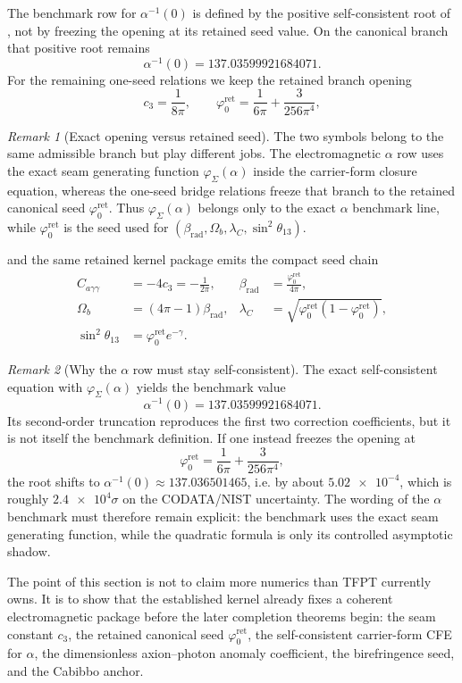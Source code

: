 \documentclass[11pt,a4paper]{article}
\theoremstyle{definition}
\theoremstyle{remark}
\newtheorem*{remark}{Remark}
\newcommand{\cthree}{c_3}
\newcommand{\phiz}{\varphi_0^{\mathrm{ret}}}
\newcommand{\phiseam}{\varphi_{\Sigma}}
\begin{document}
The benchmark row for $\alpha^{-1}(0)$ is defined by the positive self-consistent root of , not by freezing the opening at its retained seed value. On the canonical branch that positive root remains
\[
\alpha^{-1}(0)=\num{137.03599921684071}.
\]
For the remaining one-seed relations we keep the retained branch opening
\begin{equation}
\label{eq:hard-kernel-values}
\cthree=\frac{1}{8\pi},
\qquad
\phiz=\frac{1}{6\pi}+\frac{3}{256\pi^4},
\end{equation}
\begin{remark}[Exact opening versus retained seed]
The two symbols belong to the same admissible branch but play different jobs. The electromagnetic $\alpha$ row uses the exact seam generating function $\phiseam(\alpha)$ inside the carrier-form closure equation, whereas the one-seed bridge relations freeze that branch to the retained canonical seed $\phiz$. Thus $\phiseam(\alpha)$ belongs only to the exact $\alpha$ benchmark line, while $\phiz$ is the seed used for $(\beta_{\mathrm{rad}},\Omega_b,\lambda_C,\sin^2\theta_{13})$.
\end{remark}
and the same retained kernel package emits the compact seed chain
\begin{equation}
\label{eq:kernel-benchmark-formulas}
\begin{aligned}
C_{a\gamma\gamma}&=-4\cthree=-\frac{1}{2\pi},
&
\beta_{\mathrm{rad}}&=\frac{\phiz}{4\pi},
\\
\Omega_b&=(4\pi-1)\beta_{\mathrm{rad}},
&
\lambda_C&=\sqrt{\phiz(1-\phiz)},
\\
\sin^2\theta_{13}&=\phiz e^{-\gamma}.
\end{aligned}
\end{equation}
\begin{remark}[Why the $\alpha$ row must stay self-consistent]
The exact self-consistent equation with $\phiseam(\alpha)$ yields the benchmark value
\[
\alpha^{-1}(0)=\num{137.03599921684071}.
\]
Its second-order truncation reproduces the first two correction coefficients, but it is not itself the benchmark definition. If one instead freezes the opening at
\[
\phiz=\frac{1}{6\pi}+\frac{3}{256\pi^4},
\]
the root shifts to $\alpha^{-1}(0)\approx \num{137.036501465}$, i.e. by about $\num{5.02e-4}$, which is roughly $\num{2.4e4}\sigma$ on the CODATA/NIST uncertainty. The wording of the $\alpha$ benchmark must therefore remain explicit: the benchmark uses the exact seam generating function, while the quadratic formula is only its controlled asymptotic shadow.
\end{remark}
\begin{tcolorbox}[colback=tfptblue!3, colframe=tfptblue, breakable,
    title={Kernel-output package}, colbacktitle=tfptblue]
The point of this section is not to claim more numerics than TFPT currently owns. It is to show that the established kernel already fixes a coherent electromagnetic package before the later completion theorems begin: the seam constant $\cthree$, the retained canonical seed $\phiz$, the self-consistent carrier-form CFE for $\alpha$, the dimensionless axion--photon anomaly coefficient, the birefringence seed, and the Cabibbo anchor.
\end{tcolorbox}
\end{document}
